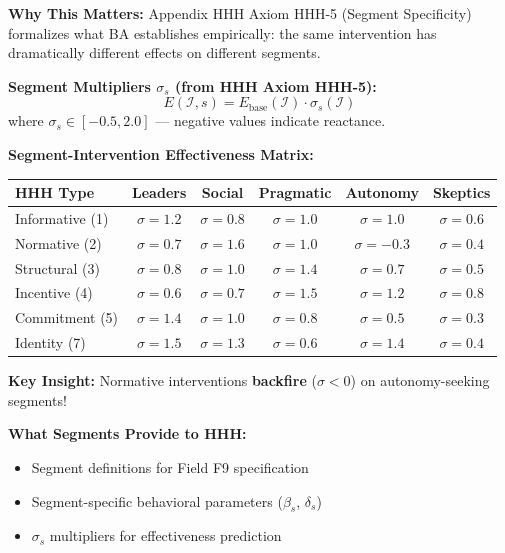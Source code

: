\begin{tcolorbox}[colback=orange!5!white, colframe=orange!75!black,
    title=\textbf{Integration: Segments $\leftrightarrow$ HHH (Intervention Toolkit)}]

\textbf{Why This Matters:}
Appendix HHH Axiom HHH-5 (Segment Specificity) formalizes what BA establishes empirically:
the same intervention has dramatically different effects on different segments.

\textbf{Segment Multipliers $\sigma_s$ (from HHH Axiom HHH-5):}
\begin{equation}
E(\mathcal{I}, s) = E_{\text{base}}(\mathcal{I}) \cdot \sigma_s(\mathcal{I})
\end{equation}
where $\sigma_s \in [-0.5, 2.0]$ --- negative values indicate reactance.

\textbf{Segment-Intervention Effectiveness Matrix:}
\begin{center}
\renewcommand{\arraystretch}{1.2}
\footnotesize
\begin{tabular}{@{}lccccc@{}}
\toprule
\textbf{HHH Type} & \textbf{Leaders} & \textbf{Social} & \textbf{Pragmatic} & \textbf{Autonomy} & \textbf{Skeptics} \\
\midrule
Informative (1) & $\sigma=1.2$ & $\sigma=0.8$ & $\sigma=1.0$ & $\sigma=1.0$ & $\sigma=0.6$ \\
Normative (2) & $\sigma=0.7$ & $\sigma=1.6$ & $\sigma=1.0$ & $\sigma=-0.3$ & $\sigma=0.4$ \\
Structural (3) & $\sigma=0.8$ & $\sigma=1.0$ & $\sigma=1.4$ & $\sigma=0.7$ & $\sigma=0.5$ \\
Incentive (4) & $\sigma=0.6$ & $\sigma=0.7$ & $\sigma=1.5$ & $\sigma=1.2$ & $\sigma=0.8$ \\
Commitment (5) & $\sigma=1.4$ & $\sigma=1.0$ & $\sigma=0.8$ & $\sigma=0.5$ & $\sigma=0.3$ \\
Identity (7) & $\sigma=1.5$ & $\sigma=1.3$ & $\sigma=0.6$ & $\sigma=1.4$ & $\sigma=0.4$ \\
\bottomrule
\end{tabular}
\end{center}

\textbf{Key Insight:} Normative interventions \textbf{backfire} ($\sigma < 0$) on autonomy-seeking segments!

\textbf{What Segments Provide to HHH:}
\begin{itemize}[nosep]
\item Segment definitions for Field F9 specification
\item Segment-specific behavioral parameters ($\beta_s$, $\delta_s$)
\item $\sigma_s$ multipliers for effectiveness prediction
\end{itemize}


\end{tcolorbox}
